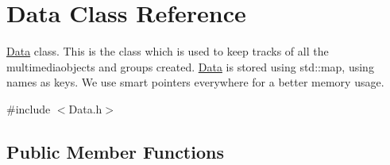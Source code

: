 \hypertarget{classData}{}\section{Data Class Reference}
\label{classData}


\hyperlink{classData}{Data} class. This is the class which is used to keep tracks of all the multimediaobjects and groups created. \hyperlink{classData}{Data} is stored using std\+::map, using names as keys. We use smart pointers everywhere for a better memory usage.  




{\ttfamily \#include $<$Data.\+h$>$}

\subsection*{Public Member Functions}
